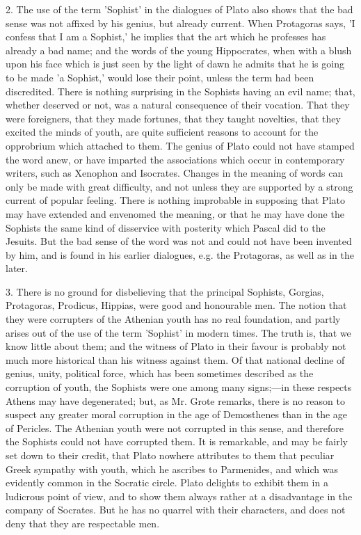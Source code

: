 \documentclass[11pt,letter]{article}
\begin{document}
\par  2. The use of the term 'Sophist' in the dialogues of Plato also shows that the bad sense was not affixed by his genius, but already current. When Protagoras says, 'I confess that I am a Sophist,' he implies that the art which he professes has already a bad name; and the words of the young Hippocrates, when with a blush upon his face which is just seen by the light of dawn he admits that he is going to be made 'a Sophist,' would lose their point, unless the term had been discredited. There is nothing surprising in the Sophists having an evil name; that, whether deserved or not, was a natural consequence of their vocation. That they were foreigners, that they made fortunes, that they taught novelties, that they excited the minds of youth, are quite sufficient reasons to account for the opprobrium which attached to them. The genius of Plato could not have stamped the word anew, or have imparted the associations which occur in contemporary writers, such as Xenophon and Isocrates. Changes in the meaning of words can only be made with great difficulty, and not unless they are supported by a strong current of popular feeling. There is nothing improbable in supposing that Plato may have extended and envenomed the meaning, or that he may have done the Sophists the same kind of disservice with posterity which Pascal did to the Jesuits. But the bad sense of the word was not and could not have been invented by him, and is found in his earlier dialogues, e.g. the Protagoras, as well as in the later.

\par  3. There is no ground for disbelieving that the principal Sophists, Gorgias, Protagoras, Prodicus, Hippias, were good and honourable men. The notion that they were corrupters of the Athenian youth has no real foundation, and partly arises out of the use of the term 'Sophist' in modern times. The truth is, that we know little about them; and the witness of Plato in their favour is probably not much more historical than his witness against them. Of that national decline of genius, unity, political force, which has been sometimes described as the corruption of youth, the Sophists were one among many signs;—in these respects Athens may have degenerated; but, as Mr. Grote remarks, there is no reason to suspect any greater moral corruption in the age of Demosthenes than in the age of Pericles. The Athenian youth were not corrupted in this sense, and therefore the Sophists could not have corrupted them. It is remarkable, and may be fairly set down to their credit, that Plato nowhere attributes to them that peculiar Greek sympathy with youth, which he ascribes to Parmenides, and which was evidently common in the Socratic circle. Plato delights to exhibit them in a ludicrous point of view, and to show them always rather at a disadvantage in the company of Socrates. But he has no quarrel with their characters, and does not deny that they are respectable men.
\end{document}
